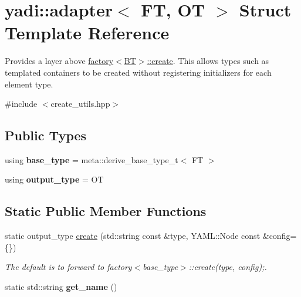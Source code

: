 \hypertarget{structyadi_1_1adapter}{}\section{yadi\+:\+:adapter$<$ FT, OT $>$ Struct Template Reference}
\label{structyadi_1_1adapter}


Provides a layer above \hyperlink{structyadi_1_1factory_a600474900d2c6fa5d09935a641298bd5}{factory$<$\+B\+T$>$\+::create}. This allows types such as templated containers to be created without registering initializers for each element type.  




{\ttfamily \#include $<$create\+\_\+utils.\+hpp$>$}

\subsection*{Public Types}
\begin{DoxyCompactItemize}
\item 
\mbox{\label{structyadi_1_1adapter_af5b708e972d0f537961e64072f0e4098}} 
using {\bfseries base\+\_\+type} = meta\+::derive\+\_\+base\+\_\+type\+\_\+t$<$ FT $>$
\item 
\mbox{\label{structyadi_1_1adapter_a3744c90afa9835b2e1e5583aea176cc0}} 
using {\bfseries output\+\_\+type} = OT
\end{DoxyCompactItemize}
\subsection*{Static Public Member Functions}
\begin{DoxyCompactItemize}
\item 
static output\+\_\+type \hyperlink{structyadi_1_1adapter_aaa3da42043e4278ad2d499f60e446602}{create} (std\+::string const \&type, Y\+A\+M\+L\+::\+Node const \&config=\{\})
\begin{DoxyCompactList}\small\item\em The default is to forward to factory$<$base\+\_\+type$>$\+::create(type, config);. \end{DoxyCompactList}\item 
\mbox{\label{structyadi_1_1adapter_a60a058b10b97dbaf116080f2a2f510fd}} 
static std\+::string {\bfseries get\+\_\+name} ()
\end{DoxyCompactItemize}


